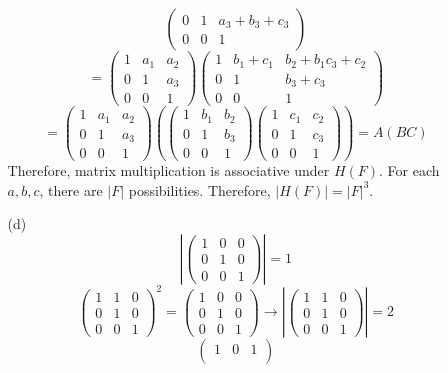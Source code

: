 \documentclass[12pt]{article}
\begin{document}
\begin{itemize}
\begin{itemize}
$$\begin{pmatrix}
0 & 1 & a_3 + b_3 + c_3 \\
0 & 0 & 1
\end{pmatrix}$$
$$= \begin{pmatrix}
1 & a_1 & a_2 \\
0 & 1 & a_3 \\
0 & 0 & 1
\end{pmatrix}\begin{pmatrix}
1 & b_1 + c_1 & b_2 + b_1c_3 + c_2 \\
0 & 1 & b_3 + c_3 \\
0 & 0 & 1
\end{pmatrix}$$
$$= \begin{pmatrix}
1 & a_1 & a_2 \\
0 & 1 & a_3 \\
0 & 0 & 1
\end{pmatrix} \left(
\begin{pmatrix}
1 & b_1 & b_2 \\
0 & 1 & b_3 \\
0 & 0 & 1
\end{pmatrix}\begin{pmatrix}
1 & c_1 & c_2 \\
0 & 1 & c_3 \\
0 & 0 & 1
\end{pmatrix} \right) = A(BC)$$
Therefore, matrix multiplication is associative under $H(F)$. For each $a, b, c$, there are $|F|$ possibilities. Therefore, $|H(F)| = |F|^3$.
\item[(d)]
$$\left| \begin{pmatrix}
1 & 0 & 0 \\
0 & 1 & 0 \\
0 & 0 & 1
\end{pmatrix} \right| = 1$$
$$\begin{pmatrix}
1 & 1 & 0 \\
0 & 1 & 0 \\
0 & 0 & 1
\end{pmatrix}^2 = \begin{pmatrix}
1 & 0 & 0 \\
0 & 1 & 0 \\
0 & 0 & 1
\end{pmatrix} \rightarrow \left| \begin{pmatrix}
1 & 1 & 0 \\
0 & 1 & 0 \\
0 & 0 & 1
\end{pmatrix} \right| = 2$$
$$\begin{pmatrix}
1 & 0 & 1 \\

\end{pmatrix}$$
\end{itemize}
\end{itemize}
\end{document}
